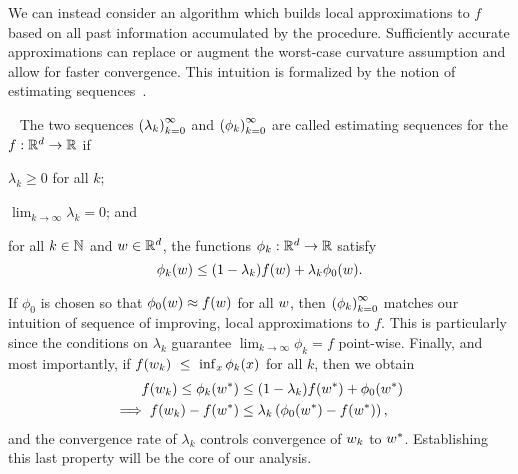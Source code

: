 We can instead consider an algorithm which builds local approximations to \( f \) based on all past information accumulated by the procedure.
Sufficiently accurate approximations can replace or augment the worst-case curvature assumption and allow for faster convergence. 
This intuition is formalized by the notion of estimating sequences~\citep{nesterov2004lectures}.

\begin{definition}~\label{def:estimating_sequences}
    The two sequences \( \left(\lambda_k\right)_{k=0}^\infty \) and \( \left(\phi_k\right)_{k=0}^\infty \) are called estimating sequences for the \( f : \mathbb{R}^d \rightarrow \mathbb{R} \) if
    \begin{inparaenum}[(1)]
        \item \( \lambda_k \geq 0 \) for all \( k \);
        \item \( \lim_{k\rightarrow \infty} \lambda_k = 0 \); and
        \item for all \( k \in \mathbb{N} \) and \( w \in \mathbb{R}^d \), the functions \( \phi_k: \mathbb{R}^d \rightarrow \mathbb{R} \) satisfy
        \[ \phi_k(w) \leq (1 - \lambda_k) f(w) + \lambda_k \phi_0(w). \]
    \end{inparaenum}
\end{definition}

If \( \phi_0 \) is chosen so that \( \phi_0(w) \approx f(w) \) for all \( w \), then \( \left(\phi_k\right)_{k=0}^\infty \) matches our intuition of sequence of improving, local approximations to \( f \).
This is particularly since the conditions on \( \lambda_k \) guarantee \( \lim_{k \rightarrow \infty} \phi_k = f \) point-wise.
Finally, and most importantly, if \( f(w_k)~\leq~\inf_x \phi_k(x) \) for all \( k \), then we obtain
\begin{align*}
    f(w_k) \leq \phi_k(w^*) &\leq (1 - \lambda_k) f(w^*) + \phi_0(w^*)\\
    \implies f(w_k) - f(w^*) &\leq \lambda_k \left(\phi_0(w^*) - f(w^*)\right),
\end{align*}
and the convergence rate of \( \lambda_k \) controls convergence of \( w_k \) to \( w^* \).
Establishing this last property will be the core of our analysis.


